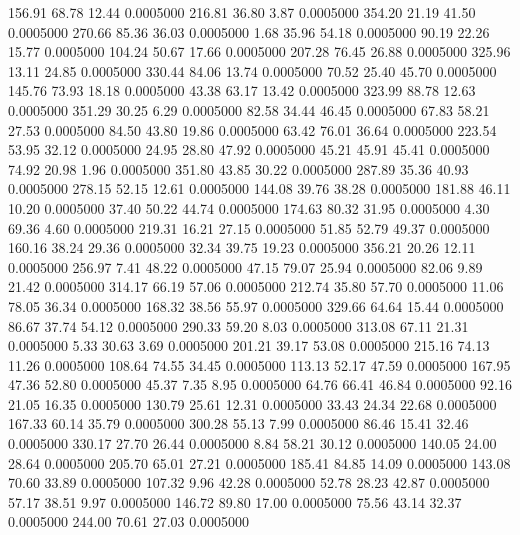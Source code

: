  156.91   68.78   12.44   0.0005000
 216.81   36.80    3.87   0.0005000
 354.20   21.19   41.50   0.0005000
 270.66   85.36   36.03   0.0005000
   1.68   35.96   54.18   0.0005000
  90.19   22.26   15.77   0.0005000
 104.24   50.67   17.66   0.0005000
 207.28   76.45   26.88   0.0005000
 325.96   13.11   24.85   0.0005000
 330.44   84.06   13.74   0.0005000
  70.52   25.40   45.70   0.0005000
 145.76   73.93   18.18   0.0005000
  43.38   63.17   13.42   0.0005000
 323.99   88.78   12.63   0.0005000
 351.29   30.25    6.29   0.0005000
  82.58   34.44   46.45   0.0005000
  67.83   58.21   27.53   0.0005000
  84.50   43.80   19.86   0.0005000
  63.42   76.01   36.64   0.0005000
 223.54   53.95   32.12   0.0005000
  24.95   28.80   47.92   0.0005000
  45.21   45.91   45.41   0.0005000
  74.92   20.98    1.96   0.0005000
 351.80   43.85   30.22   0.0005000
 287.89   35.36   40.93   0.0005000
 278.15   52.15   12.61   0.0005000
 144.08   39.76   38.28   0.0005000
 181.88   46.11   10.20   0.0005000
  37.40   50.22   44.74   0.0005000
 174.63   80.32   31.95   0.0005000
   4.30   69.36    4.60   0.0005000
 219.31   16.21   27.15   0.0005000
  51.85   52.79   49.37   0.0005000
 160.16   38.24   29.36   0.0005000
  32.34   39.75   19.23   0.0005000
 356.21   20.26   12.11   0.0005000
 256.97    7.41   48.22   0.0005000
  47.15   79.07   25.94   0.0005000
  82.06    9.89   21.42   0.0005000
 314.17   66.19   57.06   0.0005000
 212.74   35.80   57.70   0.0005000
  11.06   78.05   36.34   0.0005000
 168.32   38.56   55.97   0.0005000
 329.66   64.64   15.44   0.0005000
  86.67   37.74   54.12   0.0005000
 290.33   59.20    8.03   0.0005000
 313.08   67.11   21.31   0.0005000
   5.33   30.63    3.69   0.0005000
 201.21   39.17   53.08   0.0005000
 215.16   74.13   11.26   0.0005000
 108.64   74.55   34.45   0.0005000
 113.13   52.17   47.59   0.0005000
 167.95   47.36   52.80   0.0005000
  45.37    7.35    8.95   0.0005000
  64.76   66.41   46.84   0.0005000
  92.16   21.05   16.35   0.0005000
 130.79   25.61   12.31   0.0005000
  33.43   24.34   22.68   0.0005000
 167.33   60.14   35.79   0.0005000
 300.28   55.13    7.99   0.0005000
  86.46   15.41   32.46   0.0005000
 330.17   27.70   26.44   0.0005000
   8.84   58.21   30.12   0.0005000
 140.05   24.00   28.64   0.0005000
 205.70   65.01   27.21   0.0005000
 185.41   84.85   14.09   0.0005000
 143.08   70.60   33.89   0.0005000
 107.32    9.96   42.28   0.0005000
  52.78   28.23   42.87   0.0005000
  57.17   38.51    9.97   0.0005000
 146.72   89.80   17.00   0.0005000
  75.56   43.14   32.37   0.0005000
 244.00   70.61   27.03   0.0005000

